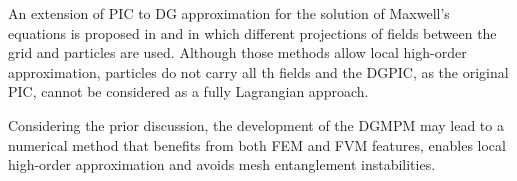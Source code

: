 An extension of PIC to DG approximation for the solution of Maxwell's equations is proposed in \cite{DGPIC_maxwell} and \cite{Stindl_DGPIC} in which different projections of fields between the grid and particles are used. Although those methods allow local high-order approximation, particles do not carry all th fields and the DGPIC, as the original PIC, cannot be considered as a fully Lagrangian approach.

Considering the prior discussion, the development of the DGMPM may lead to a numerical method that benefits from both FEM and FVM features, enables local high-order approximation and avoids mesh entanglement instabilities. 






